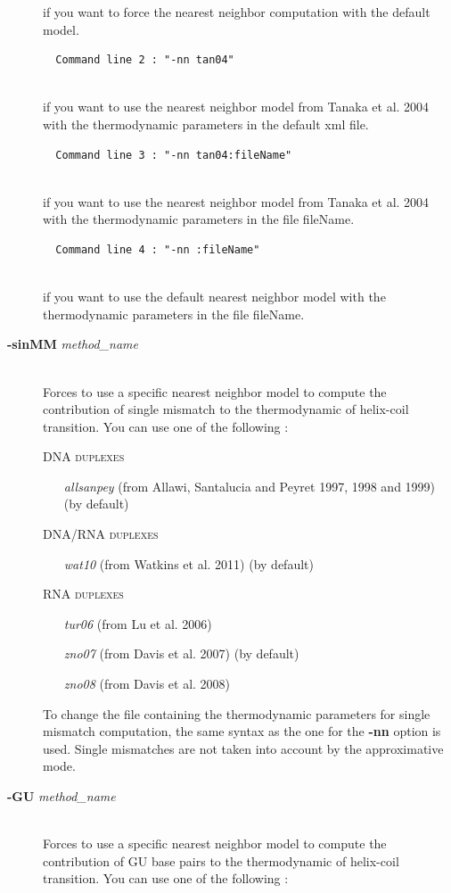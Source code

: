 \documentclass{article}
\begin{document}
\begin{description}
\begin{verbatim}
  \end{verbatim}
  if you want to force the nearest neighbor computation with the default model.
  
  \begin{verbatim}
  Command line 2 : "-nn tan04" 
  
  \end{verbatim}
  if you want to use the nearest neighbor model from Tanaka et al. 2004 with the 
  thermodynamic parameters in the default xml file.
  
  \begin{verbatim}
  Command line 3 : "-nn tan04:fileName" 
  
  \end{verbatim}
  if you want to use the nearest neighbor model from Tanaka et al. 2004 with the 
  thermodynamic parameters in the file fileName.
  
  \begin{verbatim}
  Command line 4 : "-nn :fileName" 
  
  \end{verbatim}
  if you want to use the default nearest neighbor model with the thermodynamic parameters in the file fileName.
  		  
\item [\textbf{-sinMM} \textit{method\_name}]\mbox{}\\ 
  Forces to use a specific nearest neighbor model to compute the contribution of single mismatch to the thermodynamic of helix-coil transition. 
  You can use one of the following :
  
  \textsc{DNA duplexes}
    \begin{itemize}
    \item [\textit{allsanpey}] (from Allawi, Santalucia and Peyret 1997, 1998 and 1999)  (by default) 
    \end{itemize}
  \textsc{DNA/RNA duplexes}
    \begin{itemize}
    \item [\textit{wat10}] (from Watkins et al. 2011) (by default)
    \end{itemize}
  \textsc{RNA duplexes}
    \begin{itemize}
    \item [\textit{tur06}] (from Lu et al. 2006)
    \item [\textit{zno07}] (from Davis et al. 2007)  (by default)
    \item [\textit{zno08}] (from Davis et al. 2008)		 		 
    \end{itemize}
  To change the file containing the thermodynamic parameters for single mismatch computation, the same syntax as the one for the \textbf{-nn} option is used.
  Single mismatches are not taken into account by the approximative mode.
\item [\textbf{-GU} \textit{method\_name}]\mbox{}\\ 
  Forces to use a specific nearest neighbor model to compute the contribution of GU base pairs to the thermodynamic of helix-coil transition. 
  You can use one of the following :
  

\end{description}
\end{document}
